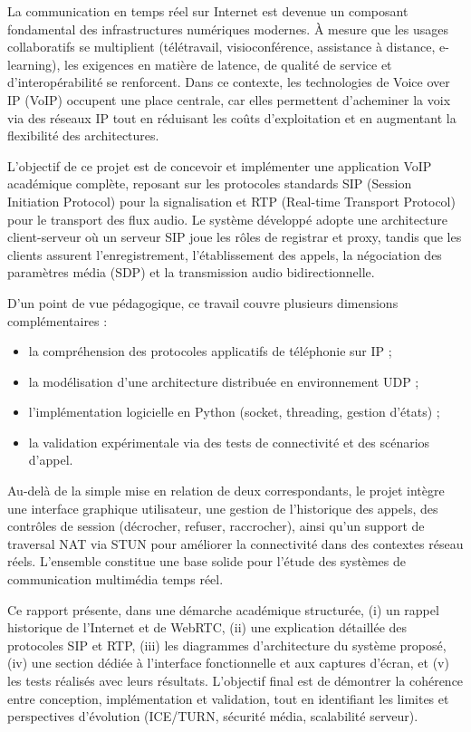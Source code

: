 \documentclass[12pt,a4paper]{article}
\begin{document}
La communication en temps réel sur Internet est devenue un composant fondamental des infrastructures numériques modernes. À mesure que les usages collaboratifs se multiplient (télétravail, visioconférence, assistance à distance, e-learning), les exigences en matière de latence, de qualité de service et d'interopérabilité se renforcent. Dans ce contexte, les technologies de Voice over IP (VoIP) occupent une place centrale, car elles permettent d'acheminer la voix via des réseaux IP tout en réduisant les coûts d'exploitation et en augmentant la flexibilité des architectures.

L'objectif de ce projet est de concevoir et implémenter une application VoIP académique complète, reposant sur les protocoles standards SIP (Session Initiation Protocol) pour la signalisation et RTP (Real-time Transport Protocol) pour le transport des flux audio. Le système développé adopte une architecture client-serveur où un serveur SIP joue les rôles de registrar et proxy, tandis que les clients assurent l'enregistrement, l'établissement des appels, la négociation des paramètres média (SDP) et la transmission audio bidirectionnelle.

D'un point de vue pédagogique, ce travail couvre plusieurs dimensions complémentaires :
\begin{itemize}[leftmargin=1.2cm]
    \item la compréhension des protocoles applicatifs de téléphonie sur IP ;
    \item la modélisation d'une architecture distribuée en environnement UDP ;
    \item l'implémentation logicielle en Python (socket, threading, gestion d'états) ;
    \item la validation expérimentale via des tests de connectivité et des scénarios d'appel.
\end{itemize}

Au-delà de la simple mise en relation de deux correspondants, le projet intègre une interface graphique utilisateur, une gestion de l'historique des appels, des contrôles de session (décrocher, refuser, raccrocher), ainsi qu'un support de traversal NAT via STUN pour améliorer la connectivité dans des contextes réseau réels. L'ensemble constitue une base solide pour l'étude des systèmes de communication multimédia temps réel.

Ce rapport présente, dans une démarche académique structurée, (i) un rappel historique de l'Internet et de WebRTC, (ii) une explication détaillée des protocoles SIP et RTP, (iii) les diagrammes d'architecture du système proposé, (iv) une section dédiée à l'interface fonctionnelle et aux captures d'écran, et (v) les tests réalisés avec leurs résultats. L'objectif final est de démontrer la cohérence entre conception, implémentation et validation, tout en identifiant les limites et perspectives d'évolution (ICE/TURN, sécurité média, scalabilité serveur).
\end{document}
